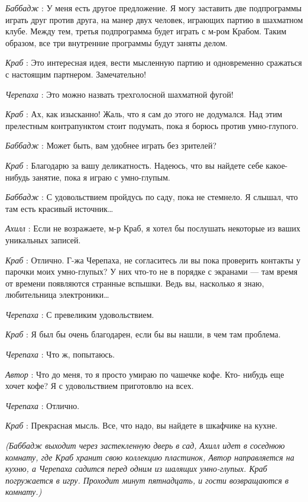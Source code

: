 \emph{Баббадж} : У меня есть другое предложение. Я могу заставить две подпрограммы играть друг против друга, на манер двух человек, играющих партию в шахматном клубе. Между тем, третья подпрограмма будет играть с м-ром Крабом. Таким образом, все три внутренние программы будут заняты делом.

\emph{Краб} : Это интересная идея, вести мысленную партию и одновременно сражаться с настоящим партнером. Замечательно!

\emph{Черепаха} : Это можно назвать трехголосной шахматной фугой!

\emph{Краб} : Ах, как изысканно! Жаль, что я сам до этого не додумался. Над этим прелестным контрапунктом стоит подумать, пока я борюсь против умно-глупого.

\emph{Баббадж} : Может быть, вам удобнее играть без зрителей?

\emph{Краб} : Благодарю за вашу деликатность. Надеюсь, что вы найдете себе какое-нибудь занятие, пока я играю с умно-глупым.

\emph{Баббадж} : С удовольствием пройдусь по саду, пока не стемнело. Я слышал, что там есть красивый источник\ldots{}

\emph{Ахилл} : Если не возражаете, м-р Краб, я хотел бы послушать некоторые из ваших уникальных записей.

\emph{Краб} : Отлично. Г-жа Черепаха, не согласитесь ли вы пока проверить контакты у парочки моих умно-глупых? У них что-то не в порядке с экранами --- там время от времени появляются странные вспышки. Ведь вы, насколько я знаю, любительница электроники\ldots{}

\emph{Черепаха} : С превеликим удовольствием.

\emph{Краб} : Я был бы очень благодарен, если бы вы нашли, в чем там проблема.

\emph{Черепаха} : Что ж, попытаюсь.

\emph{Автор} : Что до меня, то я просто умираю по чашечке кофе. Кто- нибудь еще хочет кофе? Я с удовольствием приготовлю на всех.

\emph{Черепаха} : Отлично.

\emph{Краб} : Прекрасная мысль. Все, что надо, вы найдете в шкафчике на кухне.

\emph{(Баббадж выходит через застекленную дверь в сад, Ахилл идет в соседнюю комнату, где Краб хранит свою коллекцию пластинок, Автор направляется на кухню, а Черепаха садится перед одним из шалящих умно-глупых. Краб погружается в игру. Проходит минут пятнадцать, и гости возвращаются в комнату.)}

